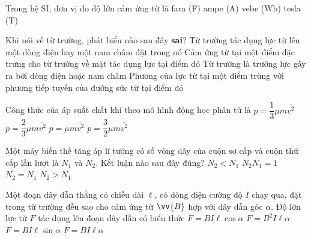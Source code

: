 	\begin{ex}%
		Trong hệ SI, đơn vị đo độ lớn cảm ứng từ là
		\choice
		{fara (F)}
		{ampe (A)}
		{vebe (Wb)}
		{\True tesla (T)}
	\end{ex}

	\begin{ex}%
		Khi nói về từ trường, phát biểu nào sau đây \textbf{sai}?
		\choice
		{Từ trường tác dụng lực từ lên một dòng điện hay một nam châm đặt trong nó}
		{Cảm ứng từ tại một điểm đặc trưng cho từ trường về mặt tác dụng lực tại điểm đó}
		{Từ trường là trường lực gây ra bởi dòng điện hoặc nam châm}
		{\True Phương của lực từ tại một điểm trùng với phương tiếp tuyến của đường sức từ tại điểm đó}
	\end{ex}

	\begin{ex}%
		Công thức của áp suất chất khí theo mô hình động học phân tử là
		\choice
		{\True $p=\dfrac{1}{3}\mu m\overline{v^2}$}
		{$p=\dfrac{2}{3}\mu m\overline{v^2}$}
		{$p=\mu m\overline{v^2}$}
		{$p=\dfrac{3}{2}\mu m\overline{v^2}$}
	\end{ex}

	\begin{ex}%
		Một máy biến thế tăng áp lí tưởng có số vòng dây của cuộn sơ cấp và cuộn thứ cấp lần lượt là $N_1$ và $N_2$. Kết luận nào sau đây đúng?
		\choice
		{$N_2<N_1$}
		{$N_2N_1=1$}
		{$N_2=N_1$}
		{\True $N_2>N_1$}
	\end{ex}

	\begin{ex}%
		Một đoạn dây dẫn thẳng có chiều dài $\ell$, có dòng điện cường độ $I$ chạy qua, đặt trong từ trường đều sao cho cảm ứng từ $\vv{B}$ hợp với dây dẫn góc $\alpha$. Độ lớn lực từ $F$ tác dụng lên đoạn dây dẫn có biểu thức
		\choice
		{$F=BI\ell\cos\alpha$}
		{$F=B^2I\ell\alpha$}
		{\True $F=BI\ell\sin\alpha$}
		{$F=BI\ell\alpha$}
	\end{ex}

